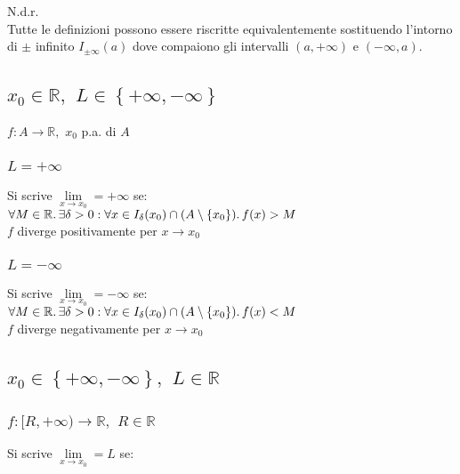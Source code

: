 \documentclass[a4paper, twoside, italian, 11pt]{book}
\newcommand{\braces}[1] {\left \{ #1 \right \}}
\newcommand{\R}{\mathbb{R}}
\begin{document}
\noindent
N.d.r. \\
Tutte le definizioni possono essere riscritte equivalentemente sostituendo l'intorno di $\pm$ infinito $I_{\pm \infty}(a)$ dove compaiono gli intervalli $(a, +\infty)$ e $(-\infty, a)$.


\subsection{$x_0 \in \R,$ $L \in \braces{+\infty, -\infty}$}

\noindent
$f : A \rightarrow \R,$ $x_0$ p.a. di $A$


\subsubsection{$L = +\infty$}

\noindent
Si scrive $\lim\limits_{x \to x_0} = +\infty$ se: \\

\noindent
$\forall M \in \R \ldotp \exists \delta > 0 : \forall x \in I_\delta(x_0) \cap (A \setminus \braces{x_0}) \ldotp f(x) > M$ \\

\noindent
$f$ diverge positivamente per $x \to x_0$


\subsubsection{$L = -\infty$}

\noindent
Si scrive $\lim\limits_{x \to x_0} = -\infty$ se: \\

\noindent
$\forall M \in \R \ldotp \exists \delta > 0 : \forall x \in I_\delta(x_0) \cap (A \setminus \braces{x_0}) \ldotp f(x) < M$ \\

\noindent
$f$ diverge negativamente per $x \to x_0$


\subsection{$x_0 \in \braces{+\infty, -\infty},$ $L \in \R$}


\subsubsection{$f: [R, +\infty) \rightarrow \R,$ $R \in \R$}

\noindent
Si scrive $\lim\limits_{x \to x_0} = L$ se: \\
\end{document}
